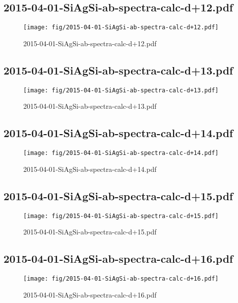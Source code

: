\documentclass[fullscreen=true]{beamer}
\begin{document}
\subsection{2015-04-01-SiAgSi-ab-spectra-calc-d+12.pdf}
\begin{frame}
  \begin{figure}
    \texttt{[image: fig/2015-04-01-SiAgSi-ab-spectra-calc-d+12.pdf]}%
    \caption{2015-04-01-SiAgSi-ab-spectra-calc-d+12.pdf}
  \end{figure}
\end{frame}

\subsection{2015-04-01-SiAgSi-ab-spectra-calc-d+13.pdf}
\begin{frame}
  \begin{figure}
    \texttt{[image: fig/2015-04-01-SiAgSi-ab-spectra-calc-d+13.pdf]}%
    \caption{2015-04-01-SiAgSi-ab-spectra-calc-d+13.pdf}
  \end{figure}
\end{frame}

\subsection{2015-04-01-SiAgSi-ab-spectra-calc-d+14.pdf}
\begin{frame}
  \begin{figure}
    \texttt{[image: fig/2015-04-01-SiAgSi-ab-spectra-calc-d+14.pdf]}%
    \caption{2015-04-01-SiAgSi-ab-spectra-calc-d+14.pdf}
  \end{figure}
\end{frame}

\subsection{2015-04-01-SiAgSi-ab-spectra-calc-d+15.pdf}
\begin{frame}
  \begin{figure}
    \texttt{[image: fig/2015-04-01-SiAgSi-ab-spectra-calc-d+15.pdf]}%
    \caption{2015-04-01-SiAgSi-ab-spectra-calc-d+15.pdf}
  \end{figure}
\end{frame}

\subsection{2015-04-01-SiAgSi-ab-spectra-calc-d+16.pdf}
\begin{frame}
  \begin{figure}
    \texttt{[image: fig/2015-04-01-SiAgSi-ab-spectra-calc-d+16.pdf]}%
    \caption{2015-04-01-SiAgSi-ab-spectra-calc-d+16.pdf}
  \end{figure}
\end{frame}
\end{document}
